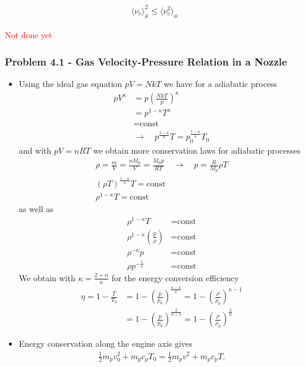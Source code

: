 \documentclass[10pt,a4paper]{book}
\theoremstyle{definition}
\begin{document}
\begin{align}
    \langle \nu_e\rangle_\mu^2\le\langle \nu_e^2\rangle_\mu    
\end{align}

\textcolor{red}{Not done yet}

\subsubsection{Problem 4.1 - Gas Velocity-Pressure Relation in a Nozzle}
\begin{itemize}
\item Using the ideal gas equation $pV=NkT$ we have for a adiabatic process
\begin{align}
    pV^\kappa&=p\left(\frac{NkT}{p}\right)^\kappa\\
    &=p^{1-\kappa}T^\kappa\\
    &=\text{const}\\
    &\rightarrow\quad p^\frac{1-\kappa}{\kappa}T=p_0^\frac{1-\kappa}{\kappa}T_0
\end{align}
and with $pV=nRT$ we obtain more conservation laws for adiabatic processes
\begin{align}
    \rho=\frac{m}{V}=\frac{nM_p}{V}=\frac{M_pp}{RT}\quad\rightarrow\quad p=\frac{R}{M_p}\rho T\\
    (\rho T)^\frac{1-\kappa}{\kappa}T=\text{const}\\
    \rho^{1-\kappa}T=\text{const}
\end{align}
as well as
\begin{align}
    \rho^{1-\kappa}T&=\text{const}\\
    \rho^{1-\kappa}\left(\frac{p}{\rho}\right)&=\text{const}\\
    \rho^{-\kappa}p&=\text{const}\\
    \rho p^{-\frac{1}{\kappa}}&=\text{const}
\end{align}
We obtain with $\kappa=\frac{2+n}{n}$ for the energy conversion efficiency 
\begin{align}
    \eta=1-\frac{T}{T_0}&=1-\left(\frac{p}{p_0}\right)^\frac{\kappa-1}{\kappa}=1-\left(\frac{\rho}{\rho_0}\right)^{\kappa-1}\\
    &=1-\left(\frac{p}{p_0}\right)^\frac{2}{n+2}=1-\left(\frac{\rho}{\rho_0}\right)^\frac{2}{n}
\end{align}
\item Energy conservation along the engine axis gives
\begin{align}
    \frac{1}{2}m_pv_0^2+m_pc_pT_0=\frac{1}{2}m_pv^2+m_pc_pT.

\end{align}
\end{itemize}
\end{document}
